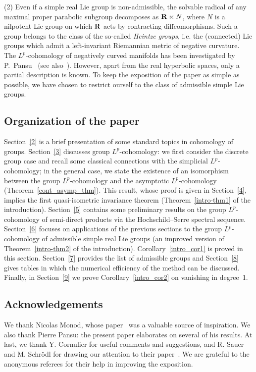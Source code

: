 \documentclass[11pt]{article}
\theoremstyle{definition}
\numberwithin{equation}{section}
\numberwithin{figure}{section}
\numberwithin{table}{section}
\begin{document}
(2) Even if a simple real Lie group is non-admissible, the solvable radical of any maximal proper parabolic subgroup decomposes as ${\bf R} \ltimes N$, where $N$ is a nilpotent Lie group on which ${\bf R}$ acts by contracting diffeomorphisms. Such a group belongs to the class of the so-called \emph{Heintze groups}, i.e. the (connected) Lie groups which admit a left-invariant Riemannian metric of negative curvature. The $L^p$-cohomology of negatively curved manifolds has been investigated by P.~Pansu~\cite{P1, Pa99} (see also~\cite{B16}). However, apart from the real hyperbolic spaces, only a partial description is known. To keep the exposition of the paper as simple as possible, we have chosen to restrict ourself to the class of admissible simple Lie groups.



\subsection*{Organization of the paper}
Section~\ref{2} is a brief presentation of some standard topics in cohomology of groups. Section~\ref{3} discusses group $L^p$-cohomology: we first consider the discrete group case and recall some classical connections with the simplicial $L^p$-cohomology; in the general case, we state the existence of an isomorphism between the group $L^p$-cohomology and the asymptotic $L^p$-cohomology (Theorem~\ref{cont_asymp_thm}). This result, whose proof is given in Section~\ref{4}, implies the first quasi-isometric invariance theorem (Theorem~\ref{intro-thm1} of the introduction). Section~\ref{5} contains some preliminary results on the group $L^p$-cohomology of semi-direct products via the Hochschild--Serre spectral sequence. Section~\ref{6} focuses on applications of the previous sections to the group $L^p$-cohomology of admissible simple real Lie groups (an improved version of Theorem~\ref{intro-thm2} of the introduction). Corollary~\ref{intro_cor1} is proved in this section. Section~\ref{7} provides the list of admissible groups and Section~\ref{8} gives tables in which the numerical efficiency of the method can be discussed. Finally, in Section~\ref{9} we prove Corollary~\ref{intro_cor2} on vanishing in degree~1.

\subsection*{Acknowledgements}
We thank Nicolas Monod, whose paper~\cite{Monod} was a valuable source of inspiration. We also thank Pierre Pansu: the present paper elaborates on several of his results. At last, we thank Y. Cornulier for useful comments and suggestions, and R. Sauer and M. Schr\"odl for drawing our attention to their paper~\cite{SaSc}. We are grateful to the anonymous referees for their help in improving the exposition.
\end{document}
